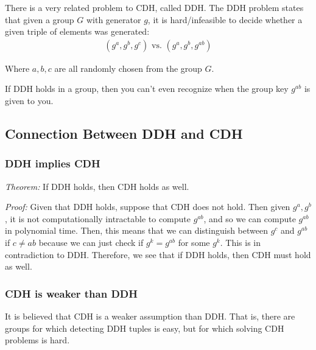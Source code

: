 \documentclass[psamsfonts]{amsart}
\begin{document}
There is a very related problem to CDH, called DDH. The DDH problem states that given a group $G$ with generator $g$, it is hard/infeasible to decide whether a given triple of elements was generated:
\begin{eqnarray}
  (g^a, g^b, g^c) \textrm{ vs. } (g^a, g^b, g^{ab})
\end{eqnarray}

Where $a,b,c$ are all randomly chosen from the group $G$.

If DDH holds in a group, then you can't even recognize when the group key $g^{ab}$ is given to you.

\subsection{Connection Between DDH and CDH}

\subsubsection{DDH implies CDH}

\emph{Theorem:} If DDH holds, then CDH holds as well.

\emph{Proof:} Given that DDH holds, suppose that CDH does not hold. Then given $g^a, g^b$, it is not computationally intractable to compute $g^{ab}$, and so we can compute $g^{ab}$ in polynomial time. Then, this means that we can distinguish between $g^c$ and $g^{ab}$ if $c \neq ab$ because we can just check if $g^k = g^{ab}$ for some $g^k$. This is in contradiction to DDH. Therefore, we see that if DDH holds, then CDH must hold as well.

\subsubsection{CDH is weaker than DDH}

It is believed that CDH is a weaker assumption than DDH. That is, there are groups for which detecting DDH tuples is easy, but for which solving CDH problems is hard.
\end{document}
